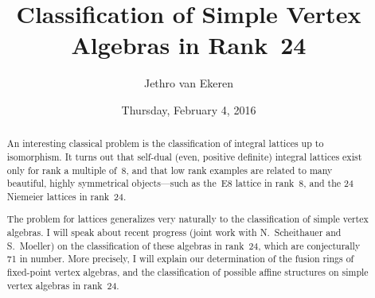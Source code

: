 \documentclass{UAmathtalk}
\author{Jethro van Ekeren}
\title{Classification of Simple Vertex Algebras in Rank~24}
\date{Thursday, February 4, 2016}
\begin{document}
\maketitle

\begin{abstract}
An interesting classical problem is the classification of integral lattices up to isomorphism. It turns out that self-dual (even, positive definite) integral lattices exist only for rank a multiple of~8, and that low rank examples are related to many beautiful, highly symmetrical objects---such as the~E8 lattice in rank~8, and the 24 Niemeier lattices in rank~24.

The problem for lattices generalizes very naturally to the classification of simple vertex algebras. I will speak about recent progress (joint work with N.~Scheithauer and S.~Moeller) on the classification of these algebras in rank~24, which are conjecturally 71 in number. More precisely, I will explain our determination of the fusion rings of fixed-point vertex algebras, and the classification of possible affine structures on simple vertex algebras in rank~24.
\end{abstract}
\end{document}
